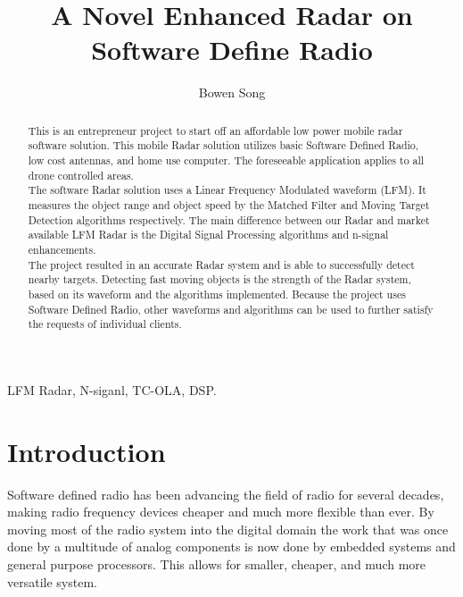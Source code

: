 \documentclass[twocolumn]{IEEEtran} %
\begin{document}
\title{A Novel Enhanced Radar on Software Define Radio} %

\author{Bowen Song}



\maketitle

\begin{abstract}
This is an entrepreneur project to start off an affordable low power mobile radar software solution. This mobile Radar solution utilizes basic Software Defined Radio, low cost antennas, and home use computer. The foreseeable application applies to all drone controlled areas.\\

The software Radar solution uses a Linear Frequency Modulated waveform (LFM). It measures the object range and object speed by the Matched Filter and Moving Target Detection algorithms respectively. The main difference between our Radar and market available LFM Radar is the Digital Signal Processing algorithms and n-signal enhancements.\\

The project resulted in an accurate Radar system and is able to successfully detect nearby targets. Detecting fast moving objects is the strength of the Radar system, based on its waveform and the algorithms implemented. Because the project uses Software Defined Radio, other waveforms and algorithms can be used to further satisfy the requests of individual clients.
\end{abstract}

\begin{keywords}
LFM Radar, N-siganl, TC-OLA, DSP. 
\end{keywords}

\section{Introduction}
Software defined radio has been advancing the field of radio for several decades, making radio frequency devices cheaper and much more flexible than ever. By moving most of the radio system into the digital domain the work that was once done by a multitude of analog components is now done by embedded systems and general purpose processors. This allows for smaller, cheaper, and much more versatile system.\\
\end{document}
